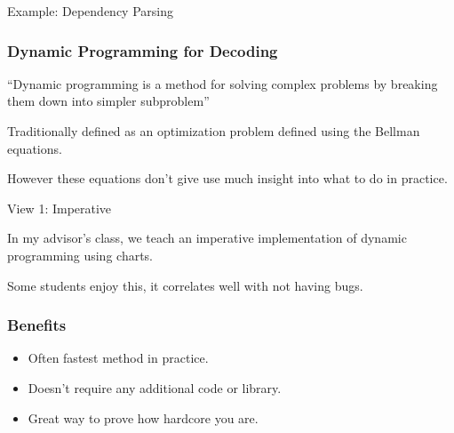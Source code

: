 \documentclass{beamer}
\def\im#1#2{
  \node(#1) [scale=#2]{\pgfbox[center,top]{\pgfuseimage{#1}}
};}
\newcommand{\air}{\vspace{0.5cm}}
\begin{document}
\begin{frame}[t]{Example: Dependency Parsing}   
   \begin{figure}
     \centering
   \end{figure}
\end{frame}

\begin{frame}
  \frametitle{Dynamic Programming for Decoding}

  ``Dynamic programming is a method for solving complex problems by breaking them down into simpler subproblem''
  
  \air 
  Traditionally defined as an optimization problem defined using the Bellman equations.

  \air
  However these equations don't give use much insight into what to do in practice.

\end{frame}


\begin{frame}
  \begin{center}
    \Large{View 1: Imperative}
  \end{center}
\end{frame}

\begin{frame}
  In my advisor's class, we teach an imperative implementation of dynamic programming using charts. 

\air 

\pause 

Some students enjoy this, it correlates well with not having bugs.
\end{frame}

\bgroup
{}

\begin{frame}[t]
  \begin{figure}
    \centering
  \end{figure}
\end{frame}

\bgroup
{}

\begin{frame}
  \frametitle{Benefits}
  \begin{itemize}
  \item Often fastest method in practice.  
    \air 

  \item Doesn't require any additional code or library.
    \air

  \item Great way to prove how hardcore you are.
  \end{itemize}
\end{frame}
\end{document}
